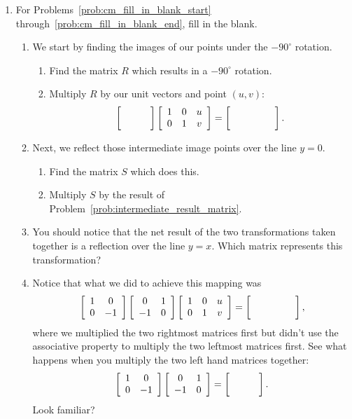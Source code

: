 \documentclass[../gatm.tex]{subfiles}
\begin{document}
\begin{enumerate}
\item For Problems~\ref{prob:cm_fill_in_blank_start} through~\ref{prob:cm_fill_in_blank_end}, fill in the blank.
\begin{enumerate}
\item We start by finding the images of our points under the $-90^\circ$ rotation. \label{prob:cm_fill_in_blank_start}
\begin{enumerate}
\item Find the matrix $R$ which results in a $-90^\circ$ rotation.
\item  \label{prob:intermediate_result_matrix} Multiply $R$ by our unit vectors and point $(u,v)$: $$\blanktwomat\left[\begin{array}{ccc} 1 & 0 & u \\ 0 & 1 & v \end{array}\right] = \left[\phantom{\begin{array}{ccc} 1 & 0 & u \\ 0 & 1 & v \end{array}}\right].$$
\end{enumerate}
\item Next, we reflect those intermediate image points over the line $y=0$.
\begin{enumerate}
\item Find the matrix $S$ which does this.
\item Multiply $S$ by the result of Problem~\ref{prob:intermediate_result_matrix}.
\end{enumerate}
\item You should notice that the net result of the two transformations taken together is a reflection over the line $y=x$. Which matrix represents this transformation?
\item Notice that what we did to achieve this mapping was $$\twomat{1}{0}{0}{-1}\twomat{0}{1}{-1}{0}\left[\begin{array}{ccc} 1 & 0 & u \\ 0 & 1 & v \end{array}\right]=\left[\phantom{\begin{array}{ccc} 1 & 0 & u \\ 0 & 1 & v \end{array}}\right],$$
where we multiplied the two rightmost matrices first but didn't use the associative property to multiply the two leftmost matrices first. See what happens when you multiply the two left hand matrices together: $$\twomat{1}{0}{0}{-1}\twomat{0}{1}{-1}{0}=\blanktwomat.$$ Look familiar?

\end{enumerate}
\end{enumerate}
\end{document}
